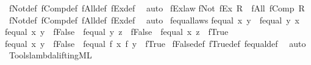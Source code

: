 \begin{isabellebody}
%
\isadelimproof
%
\endisadelimproof
%
\isatagproof
{}\isamarkupfalse%
\ fNot{\isacharunderscore}{\kern0pt}def\ fComp{\isacharunderscore}{\kern0pt}def\ fAll{\isacharunderscore}{\kern0pt}def\ fEx{\isacharunderscore}{\kern0pt}def\ \isamarkupfalse%
\ auto%
\endisatagproof
{\isafoldproof}%
%
\isadelimproof
\isanewline
%
\endisadelimproof
\isanewline
{}\isamarkupfalse%
\ fEx{\isacharunderscore}{\kern0pt}law{\isacharcolon}{\kern0pt}\isanewline
{\isachardoublequoteopen}fNot\ {\isacharparenleft}{\kern0pt}fEx\ R{\isacharparenright}{\kern0pt}\ {\isasymlongleftrightarrow}\ fAll\ {\isacharparenleft}{\kern0pt}fComp\ R{\isacharparenright}{\kern0pt}{\isachardoublequoteclose}\isanewline
%
\isadelimproof
%
\endisadelimproof
%
\isatagproof
{}\isamarkupfalse%
\ fNot{\isacharunderscore}{\kern0pt}def\ fComp{\isacharunderscore}{\kern0pt}def\ fAll{\isacharunderscore}{\kern0pt}def\ fEx{\isacharunderscore}{\kern0pt}def\ \isamarkupfalse%
\ auto%
\endisatagproof
{\isafoldproof}%
%
\isadelimproof
\isanewline
%
\endisadelimproof
\isanewline
{}\isamarkupfalse%
\ fequal{\isacharunderscore}{\kern0pt}laws{\isacharcolon}{\kern0pt}\isanewline
{\isachardoublequoteopen}fequal\ x\ y\ {\isacharequal}{\kern0pt}\ fequal\ y\ x{\isachardoublequoteclose}\isanewline
{\isachardoublequoteopen}fequal\ x\ y\ {\isacharequal}{\kern0pt}\ fFalse\ {\isasymor}\ fequal\ y\ z\ {\isacharequal}{\kern0pt}\ fFalse\ {\isasymor}\ fequal\ x\ z\ {\isacharequal}{\kern0pt}\ fTrue{\isachardoublequoteclose}\isanewline
{\isachardoublequoteopen}fequal\ x\ y\ {\isacharequal}{\kern0pt}\ fFalse\ {\isasymor}\ fequal\ {\isacharparenleft}{\kern0pt}f\ x{\isacharparenright}{\kern0pt}\ {\isacharparenleft}{\kern0pt}f\ y{\isacharparenright}{\kern0pt}\ {\isacharequal}{\kern0pt}\ fTrue{\isachardoublequoteclose}\isanewline
%
\isadelimproof
%
\endisadelimproof
%
\isatagproof
{}\isamarkupfalse%
\ fFalse{\isacharunderscore}{\kern0pt}def\ fTrue{\isacharunderscore}{\kern0pt}def\ fequal{\isacharunderscore}{\kern0pt}def\ \isamarkupfalse%
\ auto%
\endisatagproof
{\isafoldproof}%
%
\isadelimproof
%
\endisadelimproof
%
\isadelimdocument
%
\endisadelimdocument
%
\isatagdocument
%
\isamarkuptrue%
%
\endisatagdocument
{\isafolddocument}%
%
\isadelimdocument
%
\endisadelimdocument
%
\isadelimML
%
\endisadelimML
%
\isatagML
{}\isamarkupfalse%
\ {\isacartoucheopen}Tools{\isacharslash}{\kern0pt}lambda{\isacharunderscore}{\kern0pt}lifting{\isachardot}{\kern0pt}ML{\isacartoucheclose}\isanewline

\end{isabellebody}
